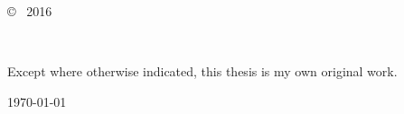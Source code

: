 \vspace*{14cm}
\begin{center}
  \makeatletter
  \copyright\ \@author{} 2016
  \makeatother
\end{center}
\noindent
\begin{center}
  \footnotesize{~} %
\end{center}
\noindent

\newpage

\vspace*{7cm}
\begin{center}
  Except where otherwise indicated, this thesis is my own original work.
\end{center}

\vspace*{4cm}

\hspace{8cm}\makeatletter\@author\makeatother\par
\hspace{8cm}\today
